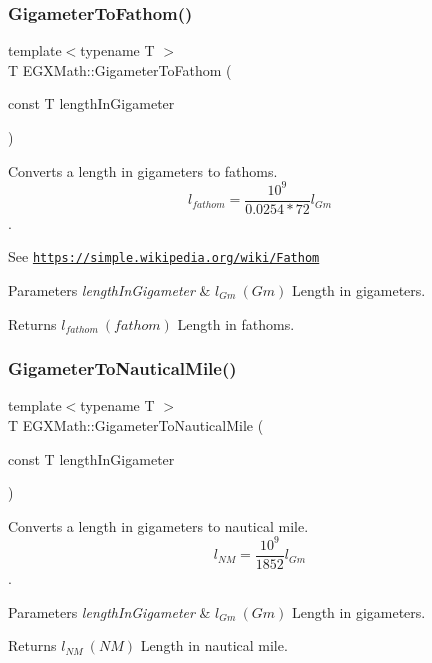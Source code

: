 \subsubsection{\texorpdfstring{Gigameter\+To\+Fathom()}{GigameterToFathom()}}
{\footnotesize\ttfamily template$<$typename T $>$ \\
T E\+G\+X\+Math\+::\+Gigameter\+To\+Fathom (\begin{DoxyParamCaption}\item[{const T}]{length\+In\+Gigameter }\end{DoxyParamCaption})}



Converts a length in gigameters to fathoms. \[ l_{fathom}= \frac{10^{9}}{0.0254 * 72} l_{Gm} \]. 

See \href{https://simple.wikipedia.org/wiki/Fathom}{\tt https\+://simple.\+wikipedia.\+org/wiki/\+Fathom} 
\begin{DoxyParams}{Parameters}
{\em length\+In\+Gigameter} & $ l_{Gm}\ (Gm)$ Length in gigameters. \\
\hline
\end{DoxyParams}
\begin{DoxyReturn}{Returns}
$ l_{fathom}\ (fathom)$ Length in fathoms. 
\end{DoxyReturn}
\mbox{\label{group___e_g_x_math-_conversions-_length_conversions-_s_i-_gigameter-_nautical_ga52d7a5290f284cdfec247ba606967867}} 
\subsubsection{\texorpdfstring{Gigameter\+To\+Nautical\+Mile()}{GigameterToNauticalMile()}}
{\footnotesize\ttfamily template$<$typename T $>$ \\
T E\+G\+X\+Math\+::\+Gigameter\+To\+Nautical\+Mile (\begin{DoxyParamCaption}\item[{const T}]{length\+In\+Gigameter }\end{DoxyParamCaption})}



Converts a length in gigameters to nautical mile. \[ l_{NM}= \frac{10^{9}}{1852} l_{Gm} \]. 


\begin{DoxyParams}{Parameters}
{\em length\+In\+Gigameter} & $ l_{Gm}\ (Gm)$ Length in gigameters. \\
\hline
\end{DoxyParams}
\begin{DoxyReturn}{Returns}
$ l_{NM}\ (NM)$ Length in nautical mile. 
\end{DoxyReturn}
